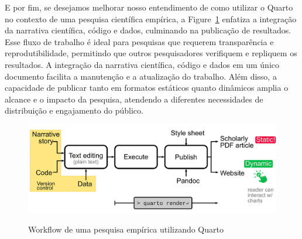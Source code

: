 \documentclass[
  a4paper,
]{article}
\begin{document}
E por fim, se desejamos melhorar nosso entendimento de como utilizar o
Quarto no contexto de uma pesquisa científica empírica, a
Figure~\ref{fig-all-workflow} enfatiza a integração da narrativa
científica, código e dados, culminando na publicação de resultados. Esse
fluxo de trabalho é ideal para pesquisas que requerem transparência e
reprodutibilidade, permitindo que outros pesquisadores verifiquem e
repliquem os resultados. A integração da narrativa científica, código e
dados em um único documento facilita a manutenção e a atualização do
trabalho. Além disso, a capacidade de publicar tanto em formatos
estáticos quanto dinâmicos amplia o alcance e o impacto da pesquisa,
atendendo a diferentes necessidades de distribuição e engajamento do
público.

\begin{figure}

\href{https://towardsdatascience.com/technical-writing-and-publishing-data-rich-articles-with-quarto-d61a56bcaa64}{\includegraphics{img/all-workflow.png}}

\caption{\label{fig-all-workflow}Workflow de uma pesquisa empírica
utilizando Quarto}

\end{figure}%
\end{document}
